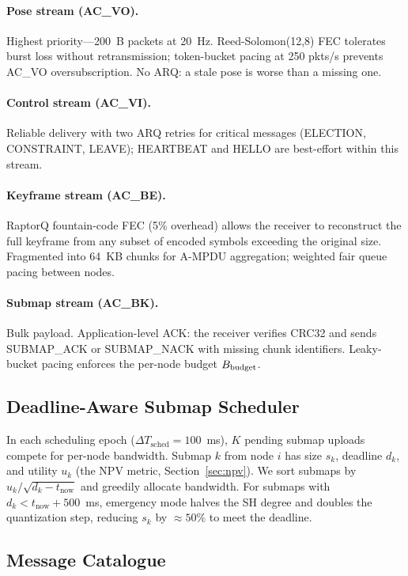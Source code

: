\paragraph{Pose stream (AC\_VO).} Highest priority---200~B packets at
20~Hz. Reed-Solomon(12,8) FEC tolerates burst loss without retransmission;
token-bucket pacing at 250 pkts/s prevents AC\_VO oversubscription. No ARQ:
a stale pose is worse than a missing one.

\paragraph{Control stream (AC\_VI).} Reliable delivery with two ARQ retries
for critical messages (ELECTION, CONSTRAINT, LEAVE); HEARTBEAT and HELLO
are best-effort within this stream.

\paragraph{Keyframe stream (AC\_BE).} RaptorQ fountain-code FEC (5\%
overhead) allows the receiver to reconstruct the full keyframe from any
subset of encoded symbols exceeding the original size. Fragmented into
64~KB chunks for A-MPDU aggregation; weighted fair queue pacing between
nodes.

\paragraph{Submap stream (AC\_BK).} Bulk payload. Application-level ACK:
the receiver verifies CRC32 and sends SUBMAP\_ACK or SUBMAP\_NACK with missing
chunk identifiers. Leaky-bucket pacing enforces the per-node budget $B_{\text{budget}}$.

\subsection{Deadline-Aware Submap Scheduler}

In each scheduling epoch ($\Delta T_{\text{sched}}=100$~ms), $K$ pending
submap uploads compete for per-node bandwidth. Submap $k$ from node $i$ has
size $s_k$, deadline $d_k$, and utility $u_k$ (the NPV metric,
Section~\ref{sec:npv}). We sort submaps by $u_k/\sqrt{d_k-t_{\text{now}}}$
and greedily allocate bandwidth. For submaps with $d_k<t_{\text{now}}+500$~ms,
emergency mode halves the SH degree and doubles the quantization step,
reducing $s_k$ by $\approx 50\%$ to meet the deadline.

\subsection{Message Catalogue}

